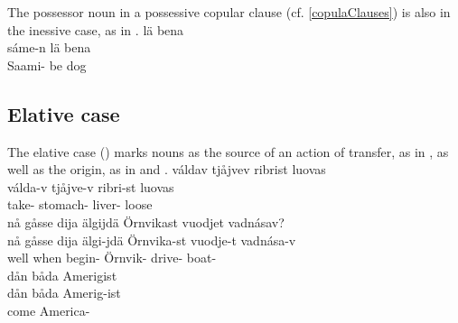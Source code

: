 The possessor noun in a possessive copular clause (cf. \SEC\ref{copulaClauses}) is also in the inessive case, as in .
\ea\label{iness3}
 lä bena\\
	sáme-n lä bena\\
	Saami- be\BS{} dog\BS{}\\\nopagebreak
{} %
\z


\subsection{Elative case}\label{elative}
The elative case (\ELATs) marks nouns as the source of an action of transfer, as in , as well as the origin, as in  and . 
\ea\label{elat1}
\glll	váldav tjåjvev {ribrist} luovas\\
	válda-v tjåjve-v ribri-st luovas\\
	take- stomach- liver- loose\\\nopagebreak
{} 
\z
\ea\label{elat2a}
\glll	nå gåsse dija älgijdä {Örnvikast} vuodjet vadnásav?\\
	nå gåsse dija älgi-jdä Örnvika-st vuodje-t vadnása-v\\ %
	well when  begin- Örnvik- drive- boat-\\\nopagebreak
{} 
\z
\ea\label{elat2b}
\glll	dån båda {Amerigist}\\
	dån båda Amerig-ist\\
	 come\BS{} America-\\\nopagebreak
{} 
\z

